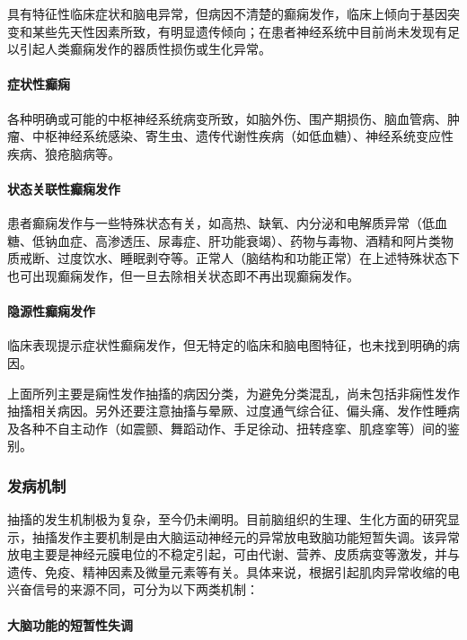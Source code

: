 具有特征性临床症状和脑电异常，但病因不清楚的癫痫发作，临床上倾向于基因突变和某些先天性因素所致，有明显遗传倾向；在患者神经系统中目前尚未发现有足以引起人类癫痫发作的器质性损伤或生化异常。

\paragraph{症状性癫痫}

各种明确或可能的中枢神经系统病变所致，如脑外伤、围产期损伤、脑血管病、肿瘤、中枢神经系统感染、寄生虫、遗传代谢性疾病（如低血糖）、神经系统变应性疾病、狼疮脑病等。

\paragraph{状态关联性癫痫发作}

患者癫痫发作与一些特殊状态有关，如高热、缺氧、内分泌和电解质异常（低血糖、低钠血症、高渗透压、尿毒症、肝功能衰竭）、药物与毒物、酒精和阿片类物质戒断、过度饮水、睡眠剥夺等。正常人（脑结构和功能正常）在上述特殊状态下也可出现癫痫发作，但一旦去除相关状态即不再出现癫痫发作。

\paragraph{隐源性癫痫发作}

临床表现提示症状性癫痫发作，但无特定的临床和脑电图特征，也未找到明确的病因。

上面所列主要是痫性发作抽搐的病因分类，为避免分类混乱，尚未包括非痫性发作抽搐相关病因。另外还要注意抽搐与晕厥、过度通气综合征、偏头痛、发作性睡病及各种不自主动作（如震颤、舞蹈动作、手足徐动、扭转痉挛、肌痉挛等）间的鉴别。

\subsubsection{发病机制}

抽搐的发生机制极为复杂，至今仍未阐明。目前脑组织的生理、生化方面的研究显示，抽搐发作主要机制是由大脑运动神经元的异常放电致脑功能短暂失调。该异常放电主要是神经元膜电位的不稳定引起，可由代谢、营养、皮质病变等激发，并与遗传、免疫、精神因素及微量元素等有关。具体来说，根据引起肌肉异常收缩的电兴奋信号的来源不同，可分为以下两类机制：

\paragraph{大脑功能的短暂性失调}

